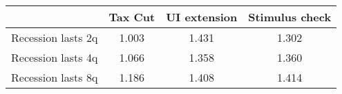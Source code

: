 \begin{tabular}{@{}lccc@{}}
\toprule
& Tax Cut    & UI extension    & Stimulus check    \\  \midrule
Recession lasts 2q &1.003  & 1.431  & 1.302     \\
Recession lasts 4q &1.066  & 1.358  & 1.360     \\
Recession lasts 8q &1.186  & 1.408  & 1.414     \\
\end{tabular}

